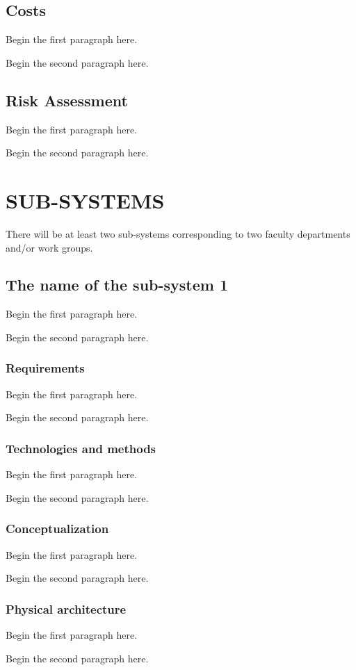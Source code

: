 \documentclass{article}
\begin{document}
\subsection{Costs}
Begin the first paragraph here.
\par
Begin the second paragraph here.

\subsection{Risk Assessment}
Begin the first paragraph here.
\par
Begin the second paragraph here.

\newpage
\section{\centering SUB-SYSTEMS}
There will be at least two sub-systems corresponding to two faculty departments and/or work groups.

\subsection{The name of the sub-system 1}
Begin the first paragraph here.
\par
Begin the second paragraph here.

\subsubsection{Requirements}
Begin the first paragraph here.
\par
Begin the second paragraph here.

\subsubsection{Technologies and methods}
Begin the first paragraph here.
\par
Begin the second paragraph here.

\subsubsection{Conceptualization}
Begin the first paragraph here.
\par
Begin the second paragraph here.

\subsubsection{Physical architecture}
Begin the first paragraph here.
\par
Begin the second paragraph here.
\end{document}
